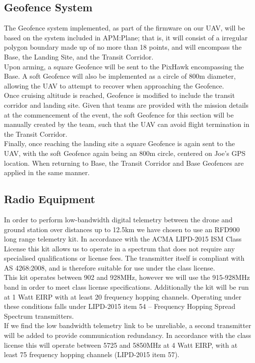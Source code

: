 \subsection{Geofence System}
The Geofence system implemented, as part of the firmware on our UAV, will be based on the system included in APM:Plane; that is, it will consist of a irregular polygon boundary made up of no more than 18 points, and will encompass the Base, the Landing Site, and the Transit Corridor.\\

Upon arming, a square Geofence will be sent to the PixHawk encompassing the Base. A soft Geofence will also be implemented as a circle of 800m diameter, allowing the UAV to attempt to recover when approaching the Geofence.\\

Once cruising altitude is reached, Geofence is modified to include the transit corridor and landing site. Given that teams are provided with the mission details at the commencement of the event, the soft Geofence for this section will be manually created by the team, such that the UAV can avoid flight termination in the Transit Corridor.\\

Finally, once reaching the landing site a square Geofence is again sent to the UAV, with the soft Geofence again being an 800m circle, centered on Joe's GPS location. When returning to Base, the Transit Corridor and Base Geofences are applied in the same manner.

\subsection{Radio Equipment}
In order to perform low-bandwidth digital telemetry between the drone and ground station over distances up to 12.5km we have chosen to use an RFD900 long range telemetry kit. In accordance with the ACMA LIPD-2015 ISM Class License this kit allows us to operate in a spectrum that does not require any specialised qualifications or license fees. The transmitter itself is compliant with AS 4268:2008, and is therefore suitable for use under the class license.\\

This kit operates between 902 and 928MHz, however we will use the 915-928MHz band in order to meet class license specifications.  Additionally the kit will be run at 1 Watt EIRP with at least 20 frequency hopping channels. Operating under these conditions falls under LIPD-2015 item 54 – Frequency Hopping Spread Spectrum transmitters.\\

If we find the low bandwidth telemetry link to be unreliable, a second transmitter will be added to provide communication redundancy. In accordance with the class license this will operate between 5725 and 5850MHz at 4 Watt EIRP, with at least 75 frequency hopping channels (LIPD-2015 item 57).